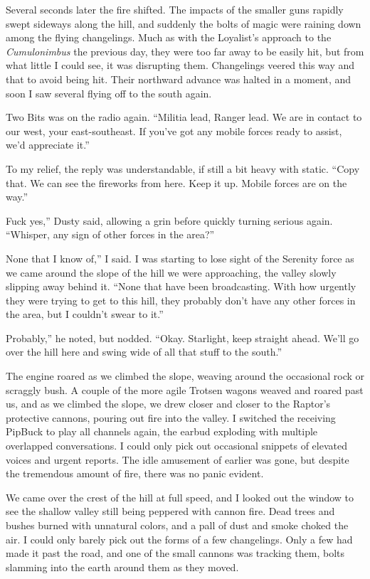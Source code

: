 Several seconds later the fire shifted. The impacts of the smaller guns rapidly swept sideways along the hill, and suddenly the bolts of magic were raining down among the flying changelings. Much as with the Loyalist’s approach to the \textit{Cumulonimbus} the previous day, they were too far away to be easily hit, but from what little I could see, it was disrupting them. Changelings veered this way and that to avoid being hit. Their northward advance was halted in a moment, and soon I saw several flying off to the south again.

Two Bits was on the radio again. “Militia lead, Ranger lead. We are in contact to our west, your east-southeast. If you’ve got any mobile forces ready to assist, we’d appreciate it.”

To my relief, the reply was understandable, if still a bit heavy with static. “Copy that. We can see the fireworks from here. Keep it up. Mobile forces are on the way.”

\leavevmode{}Fuck yes,” Dusty said, allowing a grin before quickly turning serious again. “Whisper, any sign of other forces in the area?”

\leavevmode{}None that I know of,” I said. I was starting to lose sight of the Serenity force as we came around the slope of the hill we were approaching, the valley slowly slipping away behind it. “None that have been broadcasting. With how urgently they were trying to get to this hill, they probably don’t have any other forces in the area, but I couldn’t swear to it.”

\leavevmode{}Probably,” he noted, but nodded. “Okay. Starlight, keep straight ahead. We’ll go over the hill here and swing wide of all that stuff to the south.”

The engine roared as we climbed the slope, weaving around the occasional rock or scraggly bush. A couple of the more agile Trotsen wagons weaved and roared past us, and as we climbed the slope, we drew closer and closer to the Raptor’s protective cannons, pouring out fire into the valley. I switched the receiving PipBuck to play all channels again, the earbud exploding with multiple overlapped conversations. I could only pick out occasional snippets of elevated voices and urgent reports. The idle amusement of earlier was gone, but despite the tremendous amount of fire, there was no panic evident.

We came over the crest of the hill at full speed, and I looked out the window to see the shallow valley still being peppered with cannon fire. Dead trees and bushes burned with unnatural colors, and a pall of dust and smoke choked the air. I could only barely pick out the forms of a few changelings. Only a few had made it past the road, and one of the small cannons was tracking them, bolts slamming into the earth around them as they moved.

